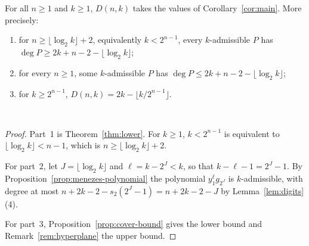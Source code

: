 \begin{theorem}\label{thm:main-formal}
For all \(n\ge1\) and \(k\ge1\), \(D(n,k)\) takes the values of
Corollary~\ref{cor:main}. More precisely:
\begin{enumerate}
 \item for \(n\ge\lfloor\log_2k\rfloor+2\), equivalently \(k<2^{n-1}\), every
 \(k\)-admissible \(P\) has \(\deg P\ge2k+n-2-\lfloor\log_2k\rfloor\);
 \item for every \(n\ge1\), some \(k\)-admissible \(P\) has
 \(\deg P\le2k+n-2-\lfloor\log_2k\rfloor\);
 \item for \(k\ge2^{n-1}\), \(D(n,k)=2k-\lfloor k/2^{n-1}\rfloor\).
\end{enumerate}
\textnormal{\small{}\,}
\end{theorem}

\begin{proof}
Part~1 is Theorem~\ref{thm:lower}. For \(k\ge1\), \(k<2^{n-1}\) is equivalent to
\(\lfloor\log_2k\rfloor<n-1\), which is \(n\ge\lfloor\log_2k\rfloor+2\).

For part~2, let \(J=\lfloor\log_2k\rfloor\) and \(\ell=k-2^J<k\), so that
\(k-\ell-1=2^J-1\). By Proposition~\ref{prop:menezes-polynomial} the polynomial
\(y_1^\ell g_{2^J}\) is \(k\)-admissible, with degree at most
\(n+2k-2-s_2(2^J-1)=n+2k-2-J\) by Lemma~\ref{lem:digits}(4).

For part~3, Proposition~\ref{prop:cover-bound} gives the lower bound and
Remark~\ref{rem:hyperplane} the upper bound.
\end{proof}

